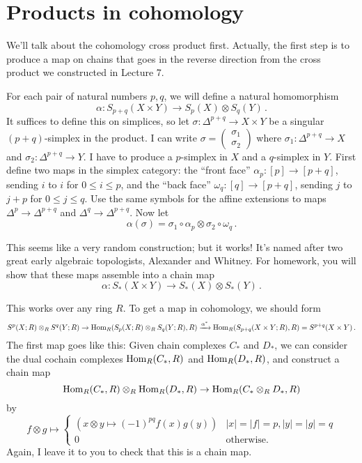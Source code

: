 \section{Products in cohomology}

We'll talk about the cohomology cross product first. Actually, the first
step is to produce a map on chains that goes in the reverse direction from
the cross product we constructed in Lecture 7. 

\begin{construction}
For each pair of natural numbers $p,q$, we will define a natural homomorphism 
\[
\alpha: S_{p+q}(X\times Y)\to S_p(X)\otimes S_q(Y)\,.
\]
It suffices to define this on simplices, so let 
$\sigma:\Delta^{p+q}\to X\times Y$ be a singular $(p+q)$-simplex in the product. I can write $\sigma=\begin{pmatrix}\sigma_1 \\ \sigma_2\end{pmatrix}$ where $\sigma_1:\Delta^{p+q}\to X$ and $\sigma_2:\Delta^{p+q}\to Y$. I have to produce
a $p$-simplex in $X$ and a $q$-simplex in $Y$. 
First define two maps in the simplex category:
 the ``front face''  $\alpha_p:[p]\to[p+q]$, sending $i$ to $i$ for $0\leq i\leq p$, and the ``back face'' $\omega_q:[q]\to[p+q]$, sending $j$ to $j+p$ for $0\leq j\leq q$. Use the same symbols for the affine 
extensions to maps $\Delta^p\to \Delta^{p+q}$ and $\Delta^q\to\Delta^{p+q}$. 
Now let 
\[
\alpha(\sigma)=\sigma_1\circ\alpha_p\otimes\sigma_2\circ\omega_q\,.
\]
\end{construction}
This seems like a very random construction; but it works! It's named after two
great early algebraic topologists, Alexander and Whitney.
For homework, you will show that these maps assemble into a chain map
\[
\alpha:S_\ast(X\times Y)\to S_\ast(X)\otimes S_\ast(Y)\,.
\]

This works over any ring $R$. To get a map in cohomology, we should form 
\[
S^p(X;R)\otimes_RS^q(Y;R)\to
\operatorname{Hom}_R(S_p(X;R)\otimes_RS_q(Y;R),R)\xrightarrow{\alpha^*}
\operatorname{Hom}_R(S_{p+q}(X\times Y;R),R)=S^{p+q}(X\times Y)\,.
\]
The first map goes like this: Given chain complexes $C_\ast$ and $D_\ast$, 
we can consider the dual cochain complexes $\operatorname{Hom}_R(C_\ast,R)$ and
$\operatorname{Hom}_R(D_\ast,R)$, and construct a chain map 
\[
\operatorname{Hom}_R(C_\ast,R)\otimes_R\operatorname{Hom}_R(D_\ast,R)\to\operatorname{Hom}_R(C_\ast\otimes_R D_\ast,R)
\]
by 
\begin{equation*}
f\otimes g\mapsto\begin{cases}
(x\otimes y\mapsto (-1)^{pq}f(x)g(y)) & |x|=|f|=p, |y|=|g|=q\\
0 & \text{otherwise}.
\end{cases}
\end{equation*}
Again, I leave it to you to check that this is a chain map. 

